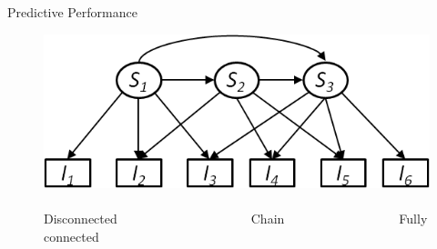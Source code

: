 \documentclass[hyperref={pdfpagelabels=false}]{beamer}
\begin{document}
\begin{frame}{Predictive Performance}
\begin{figure}[h]
\begin{center}
			\includegraphics[scale = .4]{figures/fullconnected.png}~\\
			Disconnected~~~~~~~~~~~~~~~~~~~~~Chain~~~~~~~~~~~~~~~~~~Fully connected
		\end{center}
	\end{figure}
\end{frame}
\end{document}
